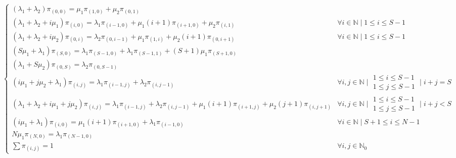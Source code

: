 \documentclass[10pt,a4paper]{article}
\begin{document}
\begin{adjustbox}{center=\textwidth}
\label{equation:AccessControlAlgorithm1-BalanceEquations}

$\begin{cases} 
(\lambda_1 + \lambda_2)\pi_{(0,0)} = \mu_1\pi_{(1,0)} + \mu_2\pi_{(0,1)} \\

(\lambda_1 + \lambda_2 + i\mu_1)\pi_{(i,0)} = \lambda_1\pi_{(i-1,0)} + \mu_1(i+1)\pi_{(i+1,0)} + \mu_2\pi_{(i,1)} & \forall i \in \mathbb{N} \mid 1 \leq i \leq S-1 \\

(\lambda_1 + \lambda_2 + i\mu_2)\pi_{(0,i)} = \lambda_2\pi_{(0,i-1)} + \mu_1\pi_{(1,i)} + \mu_2(i+1)\pi_{(0,i+1)} & \forall i \in \mathbb{N} \mid 1 \leq i \leq S-1 \\

(S\mu_1+\lambda_1)\pi_{(S,0)} = \lambda_1\pi_{(S-1,0)} + \lambda_1\pi_{(S-1,1)} + (S+1)\mu_1 \pi_{(S+1,0)}\\

(\lambda_1 + S\mu_2) \pi_{(0,S)} = \lambda_2\pi_{(0,S-1)} \\

(i\mu_1 + j\mu_2 + \lambda_1)\pi_{(i,j)} = \lambda_1\pi_{(i-1,j)} + \lambda_2\pi_{(i,j-1)} & \forall i,j \in \mathbb{N} \mid \begin{array} {l} 1 \leq i \leq S-1 \\ 1 \leq j \leq S-1 \end{array} \mid i + j = S \\

(\lambda_1 + \lambda_2 + i\mu_1 + j\mu_2)\pi_{(i,j)} = \lambda_1\pi_{(i-1,j)} + \lambda_2\pi_{(i,j-1)} + \mu_1(i+1)\pi_{(i+1,j)} + \mu_2(j+1)\pi_{(i,j+1)} & \forall i,j \in \mathbb{N} \mid \begin{array} {l} 1 \leq i \leq S-1 \\ 1 \leq j \leq S-1 \end{array} \mid i + j < S \\

(i\mu_1 + \lambda_1)\pi_{(i,0)} = \mu_1(i+1)\pi_{(i+1,0)} + \lambda_1\pi_{(i-1,0)} & \forall i \in \mathbb{N} \mid S+1 \leq i \leq N-1 \\

N\mu_1\pi_{(N,0)} = \lambda_1\pi_{(N-1,0)} \\

\sum \pi_{(i,j)} = 1 & \forall i,j \in \mathbb{N}_0

\end{cases}
$ 
\end{adjustbox}
\end{document}
